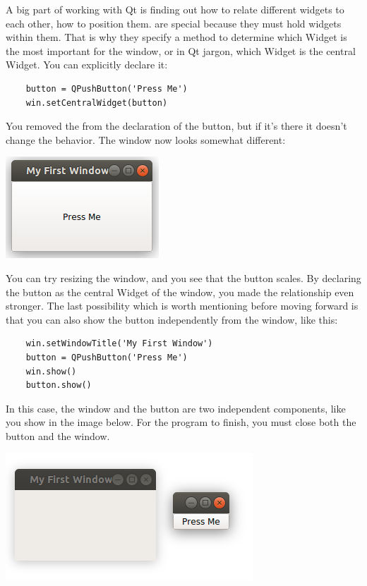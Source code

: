 
A big part of working with Qt is finding out how to relate different widgets to each other, how to position them.  are special because they must hold widgets within them. That is why they specify a method to determine which Widget is the most important for the window, or in Qt jargon, which Widget is the central Widget. You can explicitly declare it:

\begin{verbatim}
    button = QPushButton('Press Me')
    win.setCentralWidget(button)
\end{verbatim}

You removed the  from the declaration of the button, but if it's there it doesn't change the behavior. The window now looks somewhat different:

\begin{center}
    \includegraphics[width=.3\textwidth]{images/Chapter_08/03_simple_window_and_central_widget.png}
\end{center}

You can try resizing the window, and you see that the button scales. By declaring the button as the central Widget of the window, you made the relationship even stronger. The last possibility which is worth mentioning before moving forward is that you can also show the button independently from the window, like this:

\begin{verbatim}
    win.setWindowTitle('My First Window')
    button = QPushButton('Press Me')
    win.show()
    button.show()
\end{verbatim}

In this case, the window and the button are two independent components, like you show in the image below. For the program to finish, you must close both the button and the window.

\begin{center}
    \includegraphics[width=.3\textwidth]{images/Chapter_08/04_window_button_separated.png}
\end{center}

